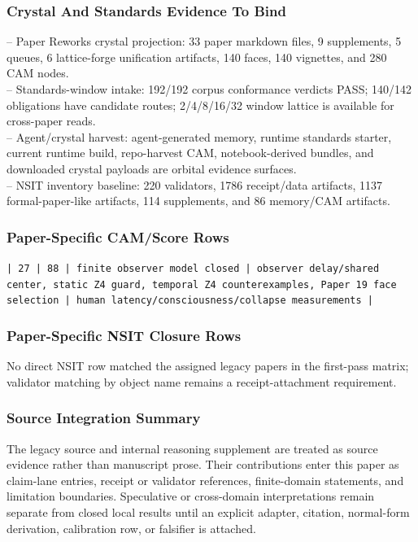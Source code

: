 \documentclass[11pt]{article}
\begin{document}
\subsubsection*{Crystal And Standards Evidence To Bind}

\noindent{}-- Paper Reworks crystal projection: 33 paper markdown files, 9 supplements, 5 queues, 6 lattice-forge unification artifacts, 140 faces, 140 vignettes, and 280 CAM nodes.\\
\noindent{}-- Standards-window intake: 192/192 corpus conformance verdicts PASS; 140/142 obligations have candidate routes; 2/4/8/16/32 window lattice is available for cross-paper reads.\\
\noindent{}-- Agent/crystal harvest: agent-generated memory, runtime standards starter, current runtime build, repo-harvest CAM, notebook-derived bundles, and downloaded crystal payloads are orbital evidence surfaces.\\
\noindent{}-- NSIT inventory baseline: 220 validators, 1786 receipt/data artifacts, 1137 formal-paper-like artifacts, 114 supplements, and 86 memory/CAM artifacts.\\

\subsubsection*{Paper-Specific CAM/Score Rows}

\noindent\texttt{| 27 | 88 | finite observer model closed | observer delay/shared center, static Z4 guard, temporal Z4 counterexamples, Paper 19 face selection | human latency/consciousness/collapse measurements |}\\

\subsubsection*{Paper-Specific NSIT Closure Rows}

No direct NSIT row matched the assigned legacy papers in the first-pass matrix; validator matching by object name remains a receipt-attachment requirement.

\subsubsection*{Source Integration Summary}

The legacy source and internal reasoning supplement are treated as source
evidence rather than manuscript prose. Their contributions enter this paper as
claim-lane entries, receipt or validator references, finite-domain statements,
and limitation boundaries. Speculative or cross-domain interpretations remain
separate from closed local results until an explicit adapter, citation,
normal-form derivation, calibration row, or falsifier is attached.
\end{document}
